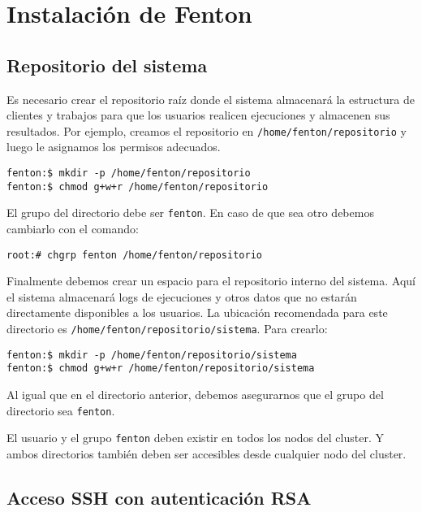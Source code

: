 \documentclass[a4paper,10pt,spanish]{article}
\begin{document}
\section{Instalaci\'{o}n de Fenton}

\subsection{Repositorio del sistema}

Es necesario crear el repositorio ra\'{i}z donde el sistema almacenar\'{a} la estructura de clientes y trabajos para que los usuarios realicen ejecuciones y almacenen sus resultados. Por ejemplo, creamos el repositorio en \mbox{\texttt{/home/fenton/repositorio}} y luego le asignamos los permisos adecuados.

\begin{verbatim}
fenton:$ mkdir -p /home/fenton/repositorio
fenton:$ chmod g+w+r /home/fenton/repositorio
\end{verbatim}

El grupo del directorio debe ser \mbox{\texttt{fenton}}. En caso de que sea otro debemos cambiarlo con el comando:

\begin{verbatim}
root:# chgrp fenton /home/fenton/repositorio
\end{verbatim}

Finalmente debemos crear un espacio para el repositorio interno del sistema. Aqu\'{i} el sistema almacenar\'{a} logs de ejecuciones y otros datos que no estar\'{a}n directamente disponibles a los usuarios. La ubicaci\'{o}n recomendada para este directorio es \mbox{\texttt{/home/fenton/repositorio/sistema}}. Para crearlo:

\begin{verbatim}
fenton:$ mkdir -p /home/fenton/repositorio/sistema
fenton:$ chmod g+w+r /home/fenton/repositorio/sistema
\end{verbatim}

Al igual que en el directorio anterior, debemos asegurarnos que el grupo del directorio sea \mbox{\texttt{fenton}}.

El usuario y el grupo \mbox{\texttt{fenton}} deben existir en todos los nodos del cluster. Y ambos directorios tambi\'{e}n deben ser accesibles desde cualquier nodo del cluster.

\subsection{Acceso SSH con autenticaci\'{o}n RSA}
\end{document}

